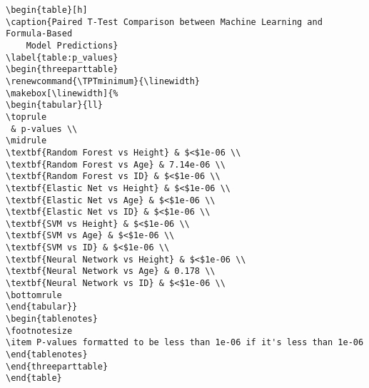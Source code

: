 \documentclass[11pt]{article}
\begin{document}
\begin{Verbatim}[tabsize=4]
\begin{table}[h]
\caption{Paired T-Test Comparison between Machine Learning and Formula-Based
	Model Predictions}
\label{table:p_values}
\begin{threeparttable}
\renewcommand{\TPTminimum}{\linewidth}
\makebox[\linewidth]{%
\begin{tabular}{ll}
\toprule
 & p-values \\
\midrule
\textbf{Random Forest vs Height} & $<$1e-06 \\
\textbf{Random Forest vs Age} & 7.14e-06 \\
\textbf{Random Forest vs ID} & $<$1e-06 \\
\textbf{Elastic Net vs Height} & $<$1e-06 \\
\textbf{Elastic Net vs Age} & $<$1e-06 \\
\textbf{Elastic Net vs ID} & $<$1e-06 \\
\textbf{SVM vs Height} & $<$1e-06 \\
\textbf{SVM vs Age} & $<$1e-06 \\
\textbf{SVM vs ID} & $<$1e-06 \\
\textbf{Neural Network vs Height} & $<$1e-06 \\
\textbf{Neural Network vs Age} & 0.178 \\
\textbf{Neural Network vs ID} & $<$1e-06 \\
\bottomrule
\end{tabular}}
\begin{tablenotes}
\footnotesize
\item P-values formatted to be less than 1e-06 if it's less than 1e-06
\end{tablenotes}
\end{threeparttable}
\end{table}

\end{Verbatim}




\end{document}
